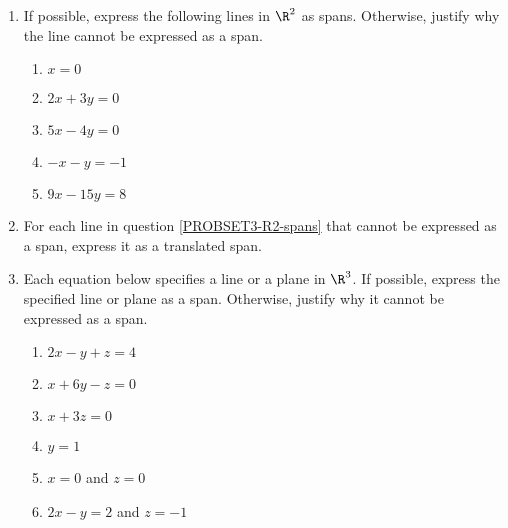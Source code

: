 \begin{exercises}
\begin{problist}
		\prob
		\begin{enumerate}
			\item If possible, express the following lines in $\R^{2}$
			as spans. Otherwise, justify why the line cannot
			be expressed as a span. \label{PROBSET3-R2-spans}
			\begin{enumerate}
				\item $x=0$
				
				\item $2x+3y=0$
				
				\item $5x-4y=0$
				
				\item $-x-y=-1$ \label{PROBSET3-R2-iv}
				
				\item $9x-15y=8$ \label{PROBSET3-R2-v}
			\end{enumerate}
			
			\item For each line in question \ref{PROBSET3-R2-spans} that cannot
			be expressed as a span, express it as a translated
			span.
			
			\item Each equation below specifies a line or a plane in $\R^3$. If possible,
			express the specified line or plane as a span. Otherwise,
			justify
			why it cannot be expressed as a span. \label{PROBSET3-R3-spans}
			\begin{enumerate}
				\item $2x-y+z=4$ \label{PROBSET3-R3-i}
				
				\item $x+6y-z=0$
				
				\item $x+3z=0$
				
				\item $y=1$ \label{PROBSET-R3-iv}
				
				\item $x=0$ and $z=0$
				
				\item $2x-y=2$ and $z=-1$ \label{PROBSET3-R3-vi}
			\end{enumerate}
			

\end{enumerate}
\end{problist}
\end{exercises}
